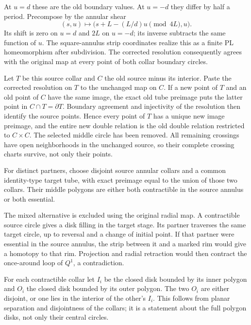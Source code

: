 At $u=d$ these are the old boundary values.  At $u=-d$ they differ
by half a period.  Precompose by the annular shear
\[
                 (s,u)\longmapsto
                 \bigl(s+L-(L/d)u\pmod {4L},u\bigr).
\]
Its shift is zero on $u=d$ and $2L$ on $u=-d$; its inverse subtracts
the same function of $u$.  The square-annulus strip coordinates
realize this as a finite PL homeomorphism after subdivision.  The
corrected resolution consequently agrees with the original map at
every point of both collar boundary circles.

Let $T$ be this source collar and $C$ the old source minus its
interior.  Paste the corrected resolution on $T$ to the unchanged
map on $C$.  If a new point of $T$ and an old point of $C$ have the
same image, the exact old tube preimage puts the latter point in
$C\cap T=\partial T$.  Boundary agreement and injectivity of the
resolution then identify the source points.  Hence every point of
$T$ has a unique new image preimage, and the entire new double
relation is the old double relation restricted to $C\times C$.
The selected middle circle has been removed.  All remaining
crossings have open neighborhoods in the unchanged source, so
their complete crossing charts survive, not only their points.

For
distinct partners, choose disjoint source annular collars and a
common identity-type target tube, with exact preimage equal to the
union of those two collars.  Their middle polygons are either both
contractible in the source annulus or both essential.

The mixed alternative is excluded using the original radial map.
A contractible source circle gives a disk filling in the target
stage.  Its partner traverses the same target circle, up to reversal
and a change of initial point.  If that partner were essential in
the source annulus, the strip between it and a marked rim would
give a homotopy to that rim.  Projection and radial retraction would
then contract the once-around loop of $Q^1$, a contradiction.

For each contractible collar let $I_i$ be the closed disk bounded
by its inner polygon and $O_i$ the closed disk bounded by its outer
polygon.  The two $O_i$ are either disjoint, or one lies in the
interior of the other's $I_i$.  This follows from planar separation
and disjointness of the collars; it is a statement about the full
polygon disks, not only their central circles.

